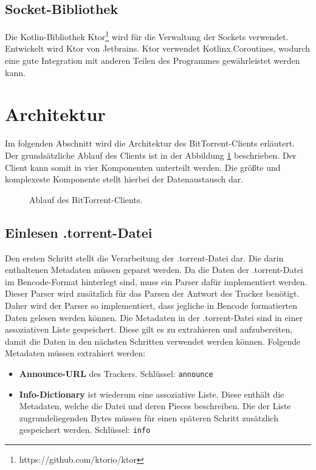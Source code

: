 \subsection{Socket-Bibliothek}

Die Kotlin-Bibliothek Ktor\footnote[4]{https://github.com/ktorio/ktor} wird für die Verwaltung der Sockets verwendet. Entwickelt wird Ktor von Jetbrains. Ktor verwendet Kotlinx.Coroutines, wodurch eine gute Integration mit anderen Teilen des Programmes gewährleistet werden kann.  

\section{Architektur}

Im folgenden Abschnitt wird die Architektur des BitTorrent-Clients erläutert. Der grundsätzliche Ablauf des Clients ist in der Abbildung \ref{fig:AblaufClient} beschrieben. Der Client kann somit in vier Komponenten unterteilt werden. Die größte und komplexeste Komponente stellt hierbei der Datenaustausch dar.

\begin{figure}[]
    \centering
    \caption{Ablauf des BitTorrent-Clients.}
    \label{fig:AblaufClient}
\end{figure}

\subsection{Einlesen .torrent-Datei}

Den ersten Schritt stellt die Verarbeitung der .torrent-Datei dar. Die darin enthaltenen Metadaten müssen geparst werden. Da die Daten der .torrent-Datei im Bencode-Format hinterlegt sind, muss ein Parser dafür implementiert werden. Dieser Parser wird zusätzlich für das Parsen der Antwort des Tracker benötigt. Daher wird der Parser so implementiert, dass jegliche in Bencode formatierten Daten gelesen werden können. Die Metadaten in der .torrent-Datei sind in einer assoziativen Liste gespeichert. Diese gilt es zu extrahieren und aufzubereiten, damit die Daten in den nächsten Schritten verwendet werden können. Folgende Metadaten müssen extrahiert werden:
\begin{itemize}
    \item \textbf{Announce-URL} des Trackers. Schlüssel: \verb|announce|
    \item \textbf{Info-Dictionary} ist wiederum eine assoziative Liste. Diese enthält die Metadaten, welche die Datei und deren Pieces beschreiben. Die der Liste zugrundeliegenden Bytes müssen für einen späteren Schritt zusätzlich gespeichert werden. Schlüssel: \verb|info|
\end{itemize}

